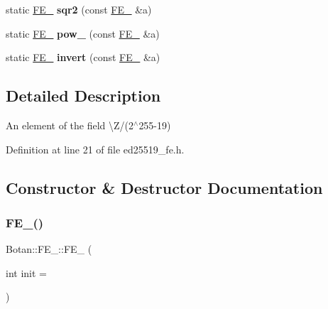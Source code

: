 \begin{DoxyCompactItemize}
\item 
\mbox{\label{class_botan_1_1_f_e__25519_ae027972c7064e90108d6669f45d01725}} 
static \mbox{\hyperlink{class_botan_1_1_f_e__25519}{F\+E\+\_}} {\bfseries sqr2} (const \mbox{\hyperlink{class_botan_1_1_f_e__25519}{F\+E\+\_}} \&a)
\item 
\mbox{\label{class_botan_1_1_f_e__25519_ab9535e15425ed5f43a4369a571c018f9}} 
static \mbox{\hyperlink{class_botan_1_1_f_e__25519}{F\+E\+\_}} {\bfseries pow\+\_} (const \mbox{\hyperlink{class_botan_1_1_f_e__25519}{F\+E\+\_}} \&a)
\item 
\mbox{\label{class_botan_1_1_f_e__25519_a642c0736576e013cfa480cddd6c0a166}} 
static \mbox{\hyperlink{class_botan_1_1_f_e__25519}{F\+E\+\_}} {\bfseries invert} (const \mbox{\hyperlink{class_botan_1_1_f_e__25519}{F\+E\+\_}} \&a)
\end{DoxyCompactItemize}


\subsection{Detailed Description}
An element of the field \textbackslash{}Z/(2$^\wedge$255-\/19) 

Definition at line 21 of file ed25519\+\_\+fe.\+h.



\subsection{Constructor \& Destructor Documentation}
\mbox{\label{class_botan_1_1_f_e__25519_abcdb26d1c8833290950d7aafabac1e94}} 
\subsubsection{\texorpdfstring{F\+E\+\_()}{FE\_25519()}}
{\footnotesize\ttfamily Botan\+::\+F\+E\+\_\+::\+F\+E\+\_ (\begin{DoxyParamCaption}\item[{int}]{init = {} }\end{DoxyParamCaption})\hspace{0.3cm}{\ttfamily [inline]}}

